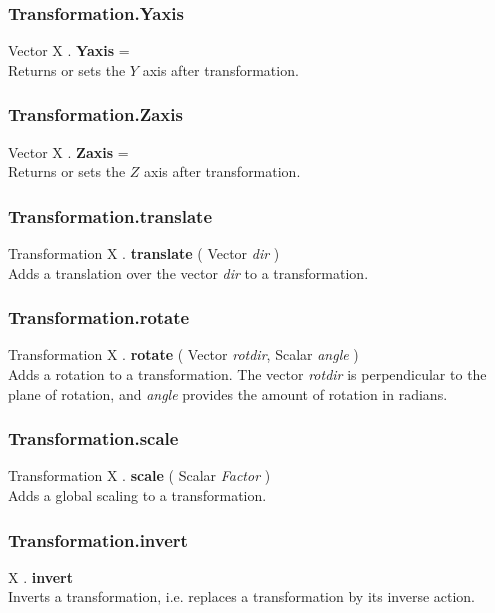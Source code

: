 \documentclass[10pt]{book}
\newcommand{\var}[1]{\textit{#1}}
\begin{document}
\subsubsection{Transformation.Yaxis \label{F:Transformation:Yaxis}}
Vector X . \textbf{Yaxis} = \\
Returns or sets the $Y$ axis after transformation.


\subsubsection{Transformation.Zaxis \label{F:Transformation:Zaxis}}
Vector X . \textbf{Zaxis} = \\
Returns or sets the $Z$ axis after transformation.


\subsubsection{Transformation.translate \label{F:Transformation:translate}}
Transformation X . \textbf{translate} ( Vector \textit{dir} ) \\
Adds a translation over the vector \var{dir} to a transformation.

\subsubsection{Transformation.rotate \label{F:Transformation:rotate}}
Transformation X . \textbf{rotate} ( Vector \textit{rotdir}, Scalar \textit{angle} ) \\
Adds a rotation to a transformation. The vector \var{rotdir} is perpendicular to the plane of rotation, and \var{angle} provides the amount of rotation in radians.

\subsubsection{Transformation.scale \label{F:Transformation:scale}}
Transformation X . \textbf{scale} ( Scalar \textit{Factor} ) \\
Adds a global scaling to a transformation.

\subsubsection{Transformation.invert \label{F:Transformation:invert}}
X . \textbf{invert} \\
Inverts a transformation, i.e. replaces a transformation by its inverse action.
\end{document}
